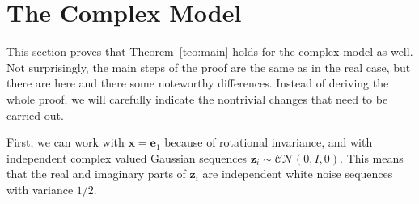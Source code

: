 \documentclass[11pt]{article}
\newcommand{\<}{\langle}
\renewcommand{\>}{\rangle}
\newcommand{\bx}{\bm{x}}
\newcommand{\be}{\bm{e}}
\newcommand{\bz}{\bm{z}}
\numberwithin{equation}{section}
\newcommand{\vv}[1]{\textcolor{green}{#1}}
\begin{document}


\section{The Complex Model} \label{sec:complex}

This section proves that Theorem~\ref{teo:main} holds for the complex
model as well.  Not surprisingly, the main steps of the proof are the
same as in the real case, but there are here and there some noteworthy
differences.  Instead of deriving the whole proof, we will carefully
indicate the nontrivial changes that need to be carried out.

First, we can work with $\bx = \be_1$ because of rotational invariance,
and with independent complex valued Gaussian sequences $\bz_i \sim
\mathcal{C}\mathcal{N}(0,I,0)$. This means that the real and imaginary
parts of $\bz_i$ are independent white noise sequences with variance
$1/2$.
\end{document}
